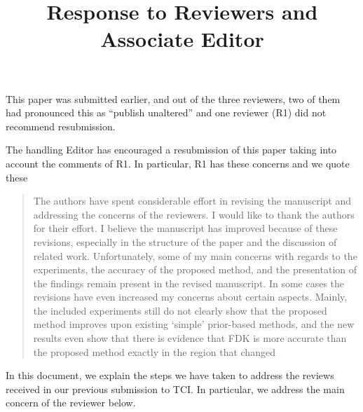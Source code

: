 \documentclass{article}
\title{Response to Reviewers and Associate Editor}
\begin{document}
\date{}
\maketitle

This paper was submitted earlier, and out of the three reviewers, two of them had pronounced this as ``publish unaltered'' and one reviewer (R1) did not recommend resubmission.

The handling Editor has encouraged a resubmission of this paper taking into account the comments of R1.  In particular, R1 has these concerns and we quote these
\begin{quote}
  The authors have spent considerable effort in revising the
  manuscript and addressing the concerns of the reviewers. I would
  like to thank the authors for their effort. I believe the manuscript
  has improved because of these revisions, especially in the structure
  of the paper and the discussion of related work. Unfortunately, some
  of my main concerns with regards to the experiments, the accuracy of
  the proposed method, and the presentation of the findings remain
  present in the revised manuscript. In some cases the revisions have
  even increased my concerns about certain aspects. Mainly, the
  included experiments still do not clearly show that the proposed
  method improves upon existing ‘simple’ prior-based methods, and the
  new results even show that there is evidence that FDK is more
  accurate than the proposed method exactly in the region that changed
  \end{quote}

In this document, we explain the steps we have taken to address the
reviews received in our previous submission to TCI. In particular,
we address the main concern of the reviewer below.
\end{document}
